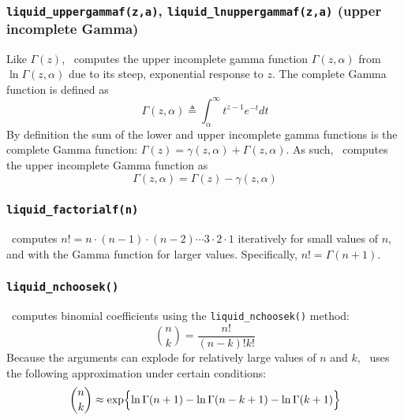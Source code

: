 % 
%
\subsubsection{{\tt liquid\_uppergammaf(z,a)},
               {\tt liquid\_lnuppergammaf(z,a)}
               (upper incomplete Gamma)}
\label{module:math:transcendentals:uppergamma}
Like $\Gamma(z)$,
\liquid\ computes the upper incomplete gamma function
$\Gamma(z,\alpha)$ from $\ln\Gamma(z,\alpha)$
due to its steep, exponential response to $z$.
The complete Gamma function is defined as
%
\begin{equation}
\label{eqn:math:uppergamma}
    \Gamma(z,\alpha) \triangleq \int_\alpha^\infty{t^{z-1}e^{-t}dt}
\end{equation}
%
By definition the sum of the lower and upper incomplete gamma functions
is the complete Gamma function:
$\Gamma(z) = \gamma(z,\alpha) + \Gamma(z,\alpha)$.
As such,
\liquid\ computes the upper incomplete Gamma function as
%
\begin{equation}
\label{eqn:math:lnuppergamma}
    \Gamma(z,\alpha) = \Gamma(z) - \gamma(z,\alpha)
\end{equation}
%



% 
%
\subsubsection{{\tt liquid\_factorialf(n)}}
\label{module:math:transcendentals:factorial}
\liquid\ computes $n!=n\cdot(n-1)\cdot(n-2)\cdots3\cdot2\cdot1$
iteratively for small values of $n$, and with the Gamma function for
larger values.
Specifically, $n! = \Gamma(n+1)$.

%
\subsubsection{{\tt liquid\_nchoosek()}}
\label{module:math:transcendentals:nchoosek}
\liquid\ computes binomial coefficients using the
{\tt liquid\_nchoosek()} method:
%
\begin{equation}
\label{eqn:math:nchoosek}
    {n \choose k} = \frac{n!}{(n-k)!k!}
\end{equation}
%
Because the arguments can explode for relatively large values of $n$ and
$k$, \liquid\ uses the following approximation under certain conditions:
\[
    {n \choose k} \approx 
        \exp\Bigl\{
            \ln\Gamma(n+1) -
            \ln\Gamma(n-k+1) -
            \ln\Gamma(k+1)
        \Bigr\}
\]

